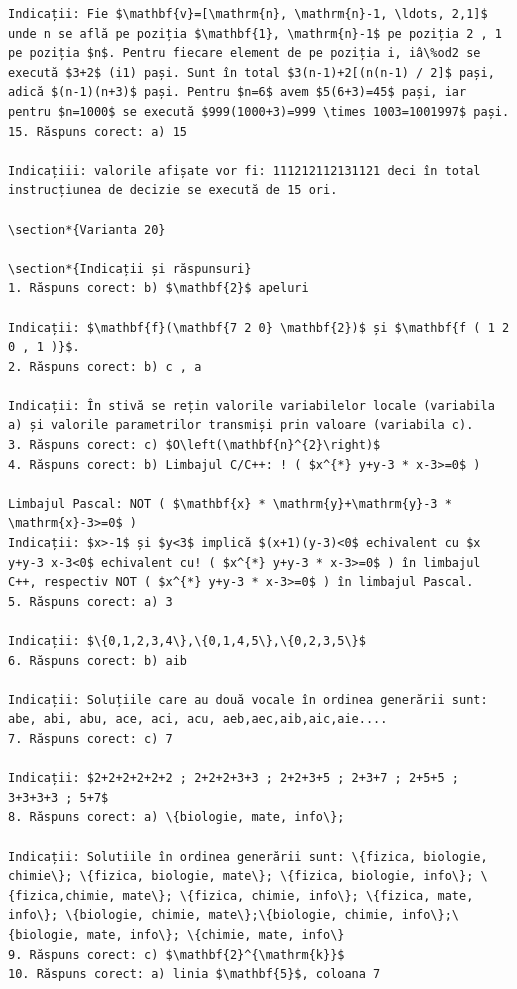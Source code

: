\documentclass[10pt]{article}
\begin{document}
\begin{verbatim}
Indicații: Fie $\mathbf{v}=[\mathrm{n}, \mathrm{n}-1, \ldots, 2,1]$ unde n se află pe poziția $\mathbf{1}, \mathrm{n}-1$ pe poziția 2 , 1 pe poziția $n$. Pentru fiecare element de pe poziția i, iâ\%od2 se execută $3+2$ (i1) pași. Sunt în total $3(n-1)+2[(n(n-1) / 2]$ pași, adică $(n-1)(n+3)$ pași. Pentru $n=6$ avem $5(6+3)=45$ pași, iar pentru $n=1000$ se execută $999(1000+3)=999 \times 1003=1001997$ pași.
15. Răspuns corect: a) 15

Indicațiii: valorile afișate vor fi: 111212112131121 deci în total instrucțiunea de decizie se execută de 15 ori.

\section*{Varianta 20}

\section*{Indicații și răspunsuri}
1. Răspuns corect: b) $\mathbf{2}$ apeluri

Indicații: $\mathbf{f}(\mathbf{7 2 0} \mathbf{2})$ și $\mathbf{f ( 1 2 0 , 1 )}$.
2. Răspuns corect: b) c , a

Indicații: În stivă se rețin valorile variabilelor locale (variabila a) și valorile parametrilor transmiși prin valoare (variabila c).
3. Răspuns corect: c) $O\left(\mathbf{n}^{2}\right)$
4. Răspuns corect: b) Limbajul C/C++: ! ( $x^{*} y+y-3 * x-3>=0$ )

Limbajul Pascal: NOT ( $\mathbf{x} * \mathrm{y}+\mathrm{y}-3 * \mathrm{x}-3>=0$ )
Indicații: $x>-1$ și $y<3$ implică $(x+1)(y-3)<0$ echivalent cu $x y+y-3 x-3<0$ echivalent cu! ( $x^{*} y+y-3 * x-3>=0$ ) în limbajul C++, respectiv NOT ( $x^{*} y+y-3 * x-3>=0$ ) în limbajul Pascal.
5. Răspuns corect: a) 3

Indicații: $\{0,1,2,3,4\},\{0,1,4,5\},\{0,2,3,5\}$
6. Răspuns corect: b) aib

Indicații: Soluțiile care au două vocale în ordinea generării sunt: abe, abi, abu, ace, aci, acu, aeb,aec,aib,aic,aie....
7. Răspuns corect: c) 7

Indicații: $2+2+2+2+2+2 ; 2+2+2+3+3 ; 2+2+3+5 ; 2+3+7 ; 2+5+5 ; 3+3+3+3 ; 5+7$
8. Răspuns corect: a) \{biologie, mate, info\};

Indicații: Solutiile în ordinea generării sunt: \{fizica, biologie, chimie\}; \{fizica, biologie, mate\}; \{fizica, biologie, info\}; \{fizica,chimie, mate\}; \{fizica, chimie, info\}; \{fizica, mate, info\}; \{biologie, chimie, mate\};\{biologie, chimie, info\};\{biologie, mate, info\}; \{chimie, mate, info\}
9. Răspuns corect: c) $\mathbf{2}^{\mathrm{k}}$
10. Răspuns corect: a) linia $\mathbf{5}$, coloana 7


\end{verbatim}
\end{document}
